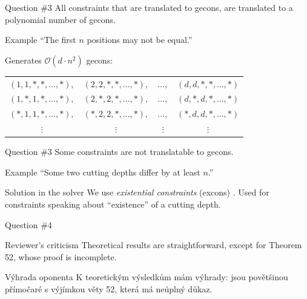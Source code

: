 \begin{frame}{Question \#3}
  All constraints that are translated to gecons,
  are translated to a polynomial number of gecons.

  \vfill

  \begin{block}{Example}
    “The first $n$ positions may not be equal.”

    \vfill

    Generates $\mathcal{O}(d \cdot n^2)$ gecons:
    \begin{tabular}{cccc}
      $(1,1,*,*,\ldots,*),$ & $(2,2,*,*,\ldots,*),$ & $\ldots,$ & $(d,d,*,*,\ldots,*)$ \\
      $(1,*,1,*,\ldots,*),$ & $(2,*,2,*,\ldots,*),$ & $\ldots,$ & $(d,*,d,*,\ldots,*)$ \\
      $(*,1,1,*,\ldots,*),$ & $(*,2,2,*,\ldots,*),$ & $\ldots,$ & $(*,d,d,*,\ldots,*)$ \\
      $\vdots$              & $\vdots$              & $\vdots$  & $\vdots$             \\
    \end{tabular}
  \end{block}
\end{frame}

\begin{frame}{Question \#3}
  Some constraints are not translatable to gecons.

  \vfill

  \begin{block}{Example}
    “Some two cutting depths differ by at least $n$.”
  \end{block}

  \vfill

  \begin{block}{Solution in the solver}
    We use \textit{existential constraints} (excons) \cite{horenovsky2018}.
    Used for constraints speaking about “existence” of a cutting depth.
  \end{block}
\end{frame}

\begin{frame}{Question \#4}

  \begin{block}{Reviewer's criticism}
    Theoretical results are straightforward,
    except for Theorem 52, whose proof is incomplete.
  \end{block}
  
  \vfill

  \begin{block}{Výhrada oponenta}
    K teoretickým výsledkům mám výhrady:
    jsou povětšinou přímočaré s výjímkou věty 52,
    která má neúplný důkaz.
  \end{block}
\end{frame}

